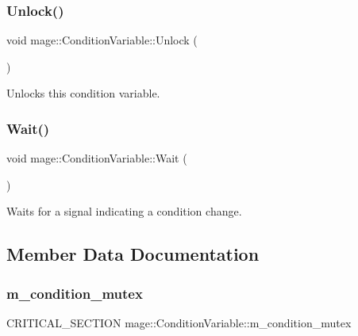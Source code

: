 \subsubsection{\texorpdfstring{Unlock()}{Unlock()}}
{\footnotesize\ttfamily void mage\+::\+Condition\+Variable\+::\+Unlock (\begin{DoxyParamCaption}{ }\end{DoxyParamCaption})\hspace{0.3cm}{\ttfamily [noexcept]}}

Unlocks this condition variable. \hypertarget{structmage_1_1_condition_variable_a15a1d797032d178c787a385d11522efb}{}\label{structmage_1_1_condition_variable_a15a1d797032d178c787a385d11522efb} 
\subsubsection{\texorpdfstring{Wait()}{Wait()}}
{\footnotesize\ttfamily void mage\+::\+Condition\+Variable\+::\+Wait (\begin{DoxyParamCaption}{ }\end{DoxyParamCaption})\hspace{0.3cm}{\ttfamily [noexcept]}}

Waits for a signal indicating a condition change. 

\subsection{Member Data Documentation}
\hypertarget{structmage_1_1_condition_variable_ab5ff870b2881a1979ccaec986d762441}{}\label{structmage_1_1_condition_variable_ab5ff870b2881a1979ccaec986d762441} 
\subsubsection{\texorpdfstring{m\+\_\+condition\+\_\+mutex}{m\_condition\_mutex}}
{\footnotesize\ttfamily C\+R\+I\+T\+I\+C\+A\+L\+\_\+\+S\+E\+C\+T\+I\+ON mage\+::\+Condition\+Variable\+::m\+\_\+condition\+\_\+mutex\hspace{0.3cm}{\ttfamily [private]}}

